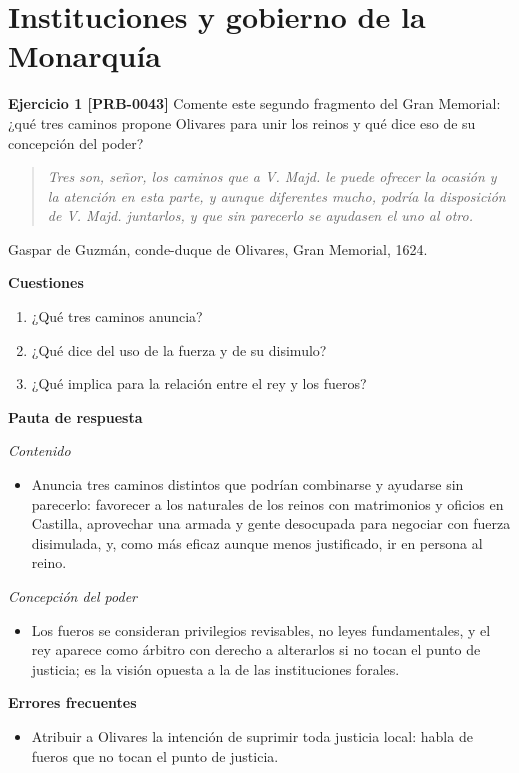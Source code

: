 \documentclass{book}
\begin{document}
\section{Instituciones y gobierno de la Monarquía}

\noindent\textbf{Ejercicio 1 [PRB-0043]}
Comente este segundo fragmento del Gran Memorial: ¿qué tres caminos propone Olivares para unir los reinos y qué dice eso de su concepción del poder?


\begin{quote}
\itshape Tres son, señor, los caminos que a V. Majd. le puede ofrecer la ocasión y la atención en esta parte, y aunque diferentes mucho, podría la disposición de V. Majd. juntarlos, y que sin parecerlo se ayudasen el uno al otro.
\end{quote}
{\noindent\footnotesize Gaspar de Guzmán, conde-duque de Olivares, Gran Memorial, 1624.\par}

\noindent\textbf{Cuestiones}
\begin{enumerate}
\item ¿Qué tres caminos anuncia?
\item ¿Qué dice del uso de la fuerza y de su disimulo?
\item ¿Qué implica para la relación entre el rey y los fueros?
\end{enumerate}

\noindent\textbf{Pauta de respuesta}

\noindent\textit{Contenido}
\begin{itemize}
\item Anuncia tres caminos distintos que podrían combinarse y ayudarse sin parecerlo: favorecer a los naturales de los reinos con matrimonios y oficios en Castilla, aprovechar una armada y gente desocupada para negociar con fuerza disimulada, y, como más eficaz aunque menos justificado, ir en persona al reino.
\end{itemize}

\noindent\textit{Concepción del poder}
\begin{itemize}
\item Los fueros se consideran privilegios revisables, no leyes fundamentales, y el rey aparece como árbitro con derecho a alterarlos si no tocan el punto de justicia; es la visión opuesta a la de las instituciones forales.
\end{itemize}

\noindent\textbf{Errores frecuentes}
\begin{itemize}
\item Atribuir a Olivares la intención de suprimir toda justicia local: habla de fueros que no tocan el punto de justicia.
\end{itemize}
\end{document}
